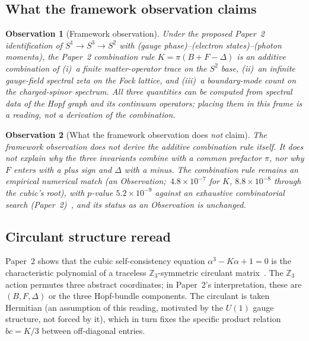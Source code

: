 \documentclass[aps,pra,twocolumn,superscriptaddress,longbibliography]{revtex4-2}
\newtheorem{observation}{Observation}
\begin{document}
\subsection{What the framework observation claims}

\begin{observation}[Framework observation]
\label{obs:framework}
Under the proposed Paper~2 identification of $S^1 \to S^3 \to S^2$ with
(gauge phase)--(electron states)--(photon momenta), the Paper~2
combination rule $K = \pi(B + F - \Delta)$ is an additive combination
of (i)~a finite matter-operator trace on the $S^2$ base, (ii)~an
infinite gauge-field spectral zeta on the Fock lattice, and (iii)~a
boundary-mode count on the charged-spinor spectrum.  All three
quantities can be computed from spectral data of the Hopf graph and
its continuum operators; placing them in this frame is a reading, not
a derivation of the combination.
\end{observation}

\begin{observation}[What the framework observation does \emph{not}
claim]
\label{obs:not_claim}
The framework observation does not derive the additive combination
rule itself.  It does not explain why the three invariants combine
with a common prefactor $\pi$, nor why $F$ enters with a plus sign
and $\Delta$ with a minus.  The combination rule remains an
empirical numerical match (an Observation;\ $4.8\times 10^{-7}$ for
$K$, $8.8 \times 10^{-8}$ through the cubic's root), with $p$-value
$5.2 \times 10^{-9}$ against an exhaustive combinatorial search
(Paper~2)~\cite{Paper2}, and its status as an Observation is unchanged.
\end{observation}

\subsection{Circulant structure reread}

Paper~2 shows that the cubic self-consistency equation
$\alpha^3 - K\alpha + 1 = 0$ is the characteristic polynomial of a
traceless $\mathbb{Z}_3$-symmetric circulant
matrix~\cite{Paper2}.  The $\mathbb{Z}_3$ action
permutes three abstract coordinates; in Paper~2's interpretation,
these are $(B, F, \Delta)$ or the three Hopf-bundle components.  The
circulant is taken Hermitian (an assumption of this reading, motivated
by the $U(1)$ gauge structure, not forced by it), which in turn fixes
the specific product relation $bc = K/3$ between off-diagonal entries.
\end{document}
